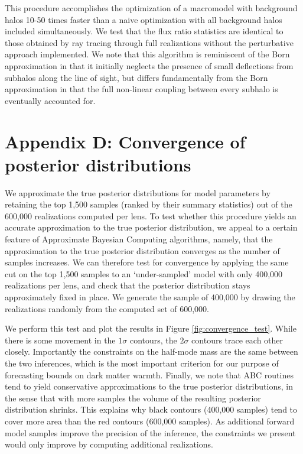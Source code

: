 This procedure accomplishes the optimization of a macromodel with background halos 10-50 times faster than a naive optimization with all background halos included simultaneously. We test that the flux ratio statistics are identical to those obtained by ray tracing through full realizations without the perturbative approach implemented. We note that this algorithm is reminiscent of the Born approximation in that it initially neglects the presence of small deflections from subhalos along the line of sight, but differs fundamentally from the Born approximation in that the full non-linear coupling between every subhalo is eventually accounted for. 

\section{Appendix D: Convergence of posterior distributions}
\label{app:D}

We approximate the true posterior distributions for model parameters by retaining the top 1,500 samples (ranked by their summary statistics) out of the 600,000 realizations computed per lens. To test whether this procedure yields an accurate approximation to the true posterior distribution, we appeal to a certain feature of Approximate Bayesian Computing algorithms, namely, that the approximation to the true posterior distribution converges as the number of samples increases. We can therefore test for convergence by applying the same cut on the top 1,500 samples to an `under-sampled' model with only 400,000 realizations per lens, and check that the posterior distribution stays approximately fixed in place. We generate the sample of 400,000 by drawing the realizations randomly from the computed set of 600,000.

We perform this test and plot the results in Figure \ref{fig:convergence_test}. While there is some movement in the $1 \sigma$ contours, the $2 \sigma$ contours trace each other closely. Importantly the constraints on the half-mode mass are the same between the two inferences, which is the most important criterion for our purpose of forecasting bounds on dark matter warmth. Finally, we note that ABC routines tend to yield conservative approximations to the true posterior distributions, in the sense that with more samples the volume of the resulting posterior distribution shrinks. This explains why black contours (400,000 samples) tend to cover more area than the red contours (600,000 samples). As additional forward model samples improve the precision of the inference, the constraints we present would only improve by computing additional realizations.  

